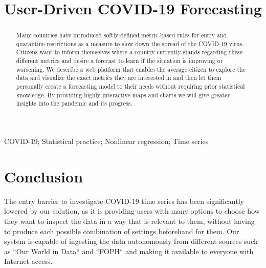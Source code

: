 \documentclass[conference]{IEEEtran}
\begin{document}
\title{User-Driven COVID-19 Forecasting}

\author{
}
\maketitle

\begin{abstract}
Many countries have introduced softly defined metric-based rules for entry and quarantine restrictions as a measure to slow down the spread of the COVID-19 virus. Citizens want to inform themselves where a country currently stands regarding these different metrics and desire a forecast to learn if the situation is improving or worsening. We describe a web platform that enables the average citizen to explore the data and visualize the exact metrics they are interested in and then let them personally create a forecasting model to their needs without requiring prior statistical knowledge. By providing highly interactive maps and charts we will give greater insights into the pandemic and its progress.
\end{abstract}

\begin{IEEEkeywords}
COVID-19; Statistical practice; Nonlinear regression; Time series
\end{IEEEkeywords}











\section{Conclusion}

The entry barrier to investigate COVID-19 time series has been significantly lowered by our solution, as it is providing users with many options to choose how they want to inspect the data in a way that is relevant to them, without having to produce each possible combination of settings beforehand for them. Our system is capable of ingesting the data autonomously from different sources such as ``Our World in Data`` and ``FOPH`` and making it available to everyone with Internet access.
\end{document}
